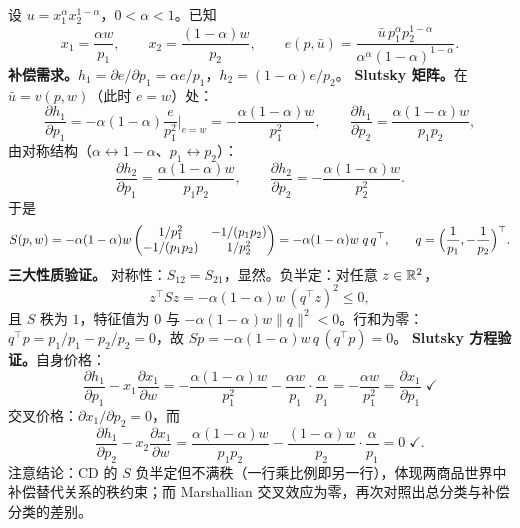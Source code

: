 \begin{example}\label{ex:cd-slutsky}
设 $u=x_1^{\alpha}x_2^{1-\alpha}$，$0<\alpha<1$。已知
\[
 x_1=\frac{\alpha w}{p_1},\qquad x_2=\frac{(1-\alpha)w}{p_2},\qquad
 e(p,\bar u)=\frac{\bar u\,p_1^{\alpha}p_2^{1-\alpha}}{\alpha^{\alpha}(1-\alpha)^{1-\alpha}} .
\]
\textbf{补偿需求。}$h_1=\partial e/\partial p_1=\alpha e/p_1$，$h_2=(1-\alpha)e/p_2$。
\textbf{Slutsky 矩阵。}在 $\bar u=v(p,w)$（此时 $e=w$）处：
\[
 \frac{\partial h_1}{\partial p_1}
 =-\alpha(1-\alpha)\frac{e}{p_1^2}\Big|_{e=w}
 =-\frac{\alpha(1-\alpha)w}{p_1^2},\qquad
 \frac{\partial h_1}{\partial p_2}
 =\frac{\alpha(1-\alpha)w}{p_1p_2},
\]
由对称结构（$\alpha\leftrightarrow1-\alpha$、$p_1\leftrightarrow p_2$）：
\[
 \frac{\partial h_2}{\partial p_1}=\frac{\alpha(1-\alpha)w}{p_1p_2},\qquad
 \frac{\partial h_2}{\partial p_2}=-\frac{\alpha(1-\alpha)w}{p_2^2}.
\]
于是
\[
 S(p,w)=-\alpha(1-\alpha)w
 \begin{pmatrix}
 1/p_1^2 & -1/(p_1p_2)\\
 -1/(p_1p_2) & 1/p_2^2
 \end{pmatrix}
 =-\alpha(1-\alpha)w\;q\,q^{\top},\qquad
 q=\Bigl(\frac1{p_1},-\frac1{p_2}\Bigr)^{\top}.
\]
\textbf{三大性质验证。}
对称性：$S_{12}=S_{21}$，显然。负半定：对任意 $z\in\mathbb{R}^2$，
\[
 z^{\top}Sz=-\alpha(1-\alpha)w\,(q^{\top}z)^2\le0,
\]
且 $S$ 秩为 $1$，特征值为 $0$ 与 $-\alpha(1-\alpha)w\|q\|^2<0$。行和为零：$q^{\top}p=p_1/p_1-p_2/p_2=0$，故 $Sp=-\alpha(1-\alpha)w\,q\,(q^{\top}p)=0$。
\textbf{Slutsky 方程验证。}自身价格：
\[
 \frac{\partial h_1}{\partial p_1}-x_1\frac{\partial x_1}{\partial w}
 =-\frac{\alpha(1-\alpha)w}{p_1^2}-\frac{\alpha w}{p_1}\cdot\frac{\alpha}{p_1}
 =-\frac{\alpha w}{p_1^2}=\frac{\partial x_1}{\partial p_1}\;\checkmark
\]
交叉价格：$\partial x_1/\partial p_2=0$，而
\[
 \frac{\partial h_1}{\partial p_2}-x_2\frac{\partial x_1}{\partial w}
 =\frac{\alpha(1-\alpha)w}{p_1p_2}-\frac{(1-\alpha)w}{p_2}\cdot\frac{\alpha}{p_1}=0\;\checkmark.
\]
注意结论：CD 的 $S$ 负半定但不满秩（一行乘比例即另一行），体现两商品世界中补偿替代关系的秩约束；而 Marshallian 交叉效应为零，再次对照出总分类与补偿分类的差别。
\end{example}

